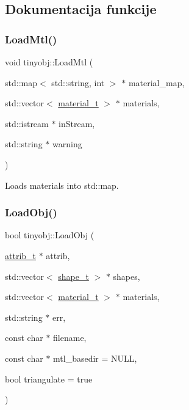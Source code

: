 \subsection{Dokumentacija funkcije}
\mbox{\label{namespacetinyobj_aa7a035d152857396e5cde8ebff8b2b9e}} 
\subsubsection{\texorpdfstring{Load\+Mtl()}{LoadMtl()}}
{\footnotesize\ttfamily void tinyobj\+::\+Load\+Mtl (\begin{DoxyParamCaption}\item[{std\+::map$<$ std\+::string, int $>$ $\ast$}]{material\+\_\+map,  }\item[{std\+::vector$<$ \hyperlink{structtinyobj_1_1material__t}{material\+\_\+t} $>$ $\ast$}]{materials,  }\item[{std\+::istream $\ast$}]{in\+Stream,  }\item[{std\+::string $\ast$}]{warning }\end{DoxyParamCaption})}



Loads materials into std\+::map. 

\mbox{\label{namespacetinyobj_a5678f6df6cb6d01bb89453022d997503}} 
\subsubsection{\texorpdfstring{Load\+Obj()}{LoadObj()}\hspace{0.1cm}{\footnotesize\ttfamily [1/2]}}
{\footnotesize\ttfamily bool tinyobj\+::\+Load\+Obj (\begin{DoxyParamCaption}\item[{\hyperlink{structtinyobj_1_1attrib__t}{attrib\+\_\+t} $\ast$}]{attrib,  }\item[{std\+::vector$<$ \hyperlink{structtinyobj_1_1shape__t}{shape\+\_\+t} $>$ $\ast$}]{shapes,  }\item[{std\+::vector$<$ \hyperlink{structtinyobj_1_1material__t}{material\+\_\+t} $>$ $\ast$}]{materials,  }\item[{std\+::string $\ast$}]{err,  }\item[{const char $\ast$}]{filename,  }\item[{const char $\ast$}]{mtl\+\_\+basedir = {\ttfamily NULL},  }\item[{bool}]{triangulate = {\ttfamily true} }\end{DoxyParamCaption})}

